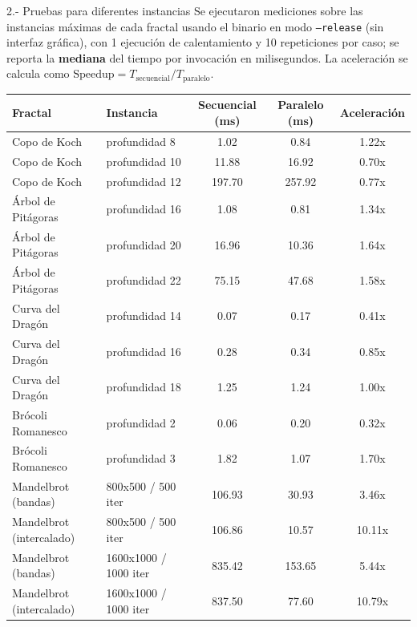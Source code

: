 \begin{respuesta}{2.- Pruebas para diferentes instancias} Se ejecutaron mediciones sobre las instancias máximas de cada fractal usando el binario en modo \texttt{--release} (sin interfaz gráfica), con 1 ejecución de calentamiento y 10 repeticiones por caso; se reporta la \textbf{mediana} del tiempo por invocación en milisegundos. La aceleración se calcula como $\text{Speedup} = T_{\text{secuencial}} / T_{\text{paralelo}}$.

    \begin{table}[H]
    \centering
    \begin{tabular}{llccc}
        \toprule
        \textbf{Fractal} & \textbf{Instancia} & \textbf{Secuencial (ms)} & \textbf{Paralelo (ms)} & \textbf{Aceleración} \\
        \midrule
        Copo de Koch & profundidad 8 & 1.02 & 0.84 & 1.22x \\
        Copo de Koch & profundidad 10 & 11.88 & 16.92 & 0.70x \\
        Copo de Koch & profundidad 12 & 197.70 & 257.92 & 0.77x \\
        Árbol de Pitágoras & profundidad 16 & 1.08 & 0.81 & 1.34x \\
        Árbol de Pitágoras & profundidad 20 & 16.96 & 10.36 & 1.64x \\
        Árbol de Pitágoras & profundidad 22 & 75.15 & 47.68 & 1.58x \\
        Curva del Dragón & profundidad 14 & 0.07 & 0.17 & 0.41x \\
        Curva del Dragón & profundidad 16 & 0.28 & 0.34 & 0.85x \\
        Curva del Dragón & profundidad 18 & 1.25 & 1.24 & 1.00x \\
        Brócoli Romanesco & profundidad 2 & 0.06 & 0.20 & 0.32x \\
        Brócoli Romanesco & profundidad 3 & 1.82 & 1.07 & 1.70x \\
        Mandelbrot (bandas) & 800x500 / 500 iter & 106.93 & 30.93 & 3.46x \\
        Mandelbrot (intercalado) & 800x500 / 500 iter & 106.86 & 10.57 & 10.11x \\
        Mandelbrot (bandas) & 1600x1000 / 1000 iter & 835.42 & 153.65 & 5.44x \\
        Mandelbrot (intercalado) & 1600x1000 / 1000 iter & 837.50 & 77.60 & 10.79x \\
        \bottomrule
    \end{tabular}
\end{table}


\end{respuesta}
